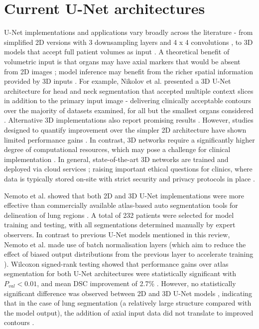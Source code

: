 \section{Current U-Net architectures}
U-Net implementations and applications vary broadly across the literature - from
simplified 2D versions with 3 downsampling layers and 4 x 4 convolutions
\cite{Nemoto_2020}, to 3D models that accept full patient volumes as input
\cite{Zhu_2018}. A theoretical benefit of volumetric input is that organs may
have axial markers that would be absent from 2D images \cite{Hesamian2019};
model inference may benefit from the richer spatial information provided by 3D
inputs \cite{Nemoto_2020}. For example, Nikolov et al. presented a 3D U-Net
architecture for head and neck segmentation that accepted multiple context
slices in addition to the primary input image \cite{Nikolov_2018} - delivering
clinically acceptable contours over the majority of datasets examined, for all
but the smallest organs considered \cite{Nikolov_2018}. Alternative 3D
implementations also report promising results \cite{ Nikolov_2018, Zhu_2018,
_i_ek_2016}. However, studies designed to quantify improvement over the simpler
2D architecture have shown limited performance gains \cite{Nemoto_2020}. In
contrast, 3D networks require a significantly higher degree of computational
resources, which may pose a challenge for clinical implementation
\cite{Nemoto_2020}. In general, state-of-the-art 3D networks are trained and
deployed via cloud services \cite{Nemoto_2020}; raising important ethical
questions for clinics, where data is typically stored on-site with strict
security and privacy protocols in place \cite{Nemoto_2020, Lundervold2019}.

Nemoto et al. showed that both 2D and 3D U-Net implementations were more
effective than commercially available atlas-based auto segmentation tools for
delineation of lung regions \cite{Nemoto_2020}. A total of 232 patients were
selected for model training and testing, with all segmentations determined
manually by expert observers. In contrast to previous U-Net models mentioned in
this review, Nemoto et al. made use of batch normalisation layers (which aim to
reduce the effect of biased output distributions from the previous layer to
accelerate training \cite{santurkar2018}). Wilcoxon signed-rank testing showed
that performance gains over atlas segmentation for both U-Net architectures were
statistically significant with $P_{val}<0.01$, and mean DSC improvement of 2.7\%
\cite{Nemoto_2020}. However, no statistically significant difference was
observed between 2D and 3D U-Net models \cite{Nemoto_2020}, indicating that in
the case of lung segmentation (a relatively large structure compared with the
model output), the addition of axial input data did not translate to improved
contours \cite{Nemoto_2020}.

